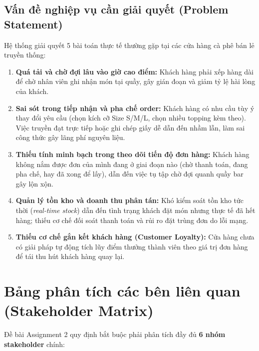 \documentclass[12pt,a4paper]{article}
\begin{document}
\subsection{Vấn đề nghiệp vụ cần giải quyết (Problem Statement)}
Hệ thống giải quyết 5 bài toán thực tế thường gặp tại các cửa hàng cà phê bán lẻ truyền thống:
\begin{enumerate}[leftmargin=*,itemsep=2pt]
    \item \textbf{Quá tải và chờ đợi lâu vào giờ cao điểm:} Khách hàng phải xếp hàng dài để chờ nhân viên ghi nhận món tại quầy, gây gián đoạn và giảm tỷ lệ hài lòng của khách.
    \item \textbf{Sai sót trong tiếp nhận và pha chế order:} Khách hàng có nhu cầu tùy ý thay đổi yêu cầu (chọn kích cỡ Size S/M/L, chọn nhiều topping kèm theo). Việc truyền đạt trực tiếp hoặc ghi chép giấy dễ dẫn đến nhầm lẫn, làm sai công thức gây lãng phí nguyên liệu.
    \item \textbf{Thiếu tính minh bạch trong theo dõi tiến độ đơn hàng:} Khách hàng không nắm được đơn của mình đang ở giai đoạn nào (chờ thanh toán, đang pha chế, hay đã xong để lấy), dẫn đến việc tụ tập chờ đợi quanh quầy bar gây lộn xộn.
    \item \textbf{Quản lý tồn kho và doanh thu phân tán:} Khó kiểm soát tồn kho tức thời (\textit{real-time stock}) dẫn đến tình trạng khách đặt món nhưng thực tế đã hết hàng; thiếu cơ chế đối soát thanh toán và rủi ro đặt trùng đơn do lỗi mạng.
    \item \textbf{Thiếu cơ chế gắn kết khách hàng (Customer Loyalty):} Cửa hàng chưa có giải pháp tự động tích lũy điểm thưởng thành viên theo giá trị đơn hàng để tái thu hút khách hàng quay lại.
\end{enumerate}

\clearpage

\section{Bảng phân tích các bên liên quan (Stakeholder Matrix)}

Đề bài Assignment 2 quy định bắt buộc phải phân tích đầy đủ \textbf{6 nhóm stakeholder} chính:
\end{document}

